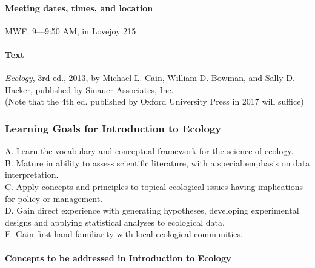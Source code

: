 \documentclass[]{article}
\let\oldparagraph\paragraph
\renewcommand{\paragraph}[1]{\oldparagraph{#1}\mbox{}}
\begin{document}
\paragraph{Meeting dates, times, and location
}\label{meeting-dates-times-and-location}

MWF, 9---9:50 AM, in Lovejoy 215

\paragraph{Text }\label{text}

\emph{Ecology}, 3rd ed., 2013, by Michael L. Cain, William D. Bowman,
and Sally D. Hacker, published by Sinauer Associates, Inc.\\
(Note that the 4th ed. published by Oxford University Press in 2017 will
suffice)

\subsubsection{Learning Goals for Introduction to Ecology
}\label{learning-goals-for-introduction-to-ecology}

A. Learn the vocabulary and conceptual framework for the science of
ecology.\\
B. Mature in ability to assess scientific literature, with a special
emphasis on data interpretation.\\
C. Apply concepts and principles to topical ecological issues having
implications for policy or management.\\
D. Gain direct experience with generating hypotheses, developing
experimental designs and applying statistical analyses to ecological
data.\\
E. Gain first-hand familiarity with local ecological communities.

\paragraph{Concepts to be addressed in Introduction to
Ecology}\label{concepts-to-be-addressed-in-introduction-to-ecology}
\end{document}
